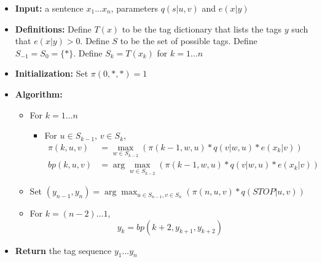 \documentclass[11pt]{scrartcl}
\begin{document}
\begin{itemize}
\item \textbf{Input:} a sentence $x_1 ... x_n$, parameters $q(s|u,v)$ and $e(x|y)$
\item \textbf{Definitions:} Define $T(x)$ to be the tag dictionary that lists the tags $y$ such that $e(x|y) > 0$. Define $S$ to be the set of possible tags. Define $S_{-1} = S_0 = \{*\}$. Define $S_k = T(x_k)$ for $k = 1 ... n$
\item \textbf{Initialization:} Set $\pi(0, *, *) = 1$
\item \textbf{Algorithm:}

\begin{itemize}
\item For $k = 1 ... n$

\begin{itemize}
\item For $u \in S_{k-1}$, $v \in S_{k}$,
\begin{align*}
\pi(k, u, v) &= \max_{w \in S_{k-2}} \left( \pi(k-1, w, u) * q(v | w, u) * e(x_k | v) \right) \\
bp(k, u, v) &= \arg \max_{w \in S_{k-2}} \left( \pi(k-1, w, u) * q(v | w, u) * e(x_k | v) \right)
\end{align*}
\end{itemize}
\item Set $(y_{n-1}, y_n) = \arg \max_{u \in S_{n-1}, v \in S_{n}} (\pi (n, u, v) * q(STOP | u, v))$
\item For $k = (n-2) ... 1$,
\[ y_k = bp(k+2, y_{k+1}, y_{k+2}) \]
\end{itemize}
\item \textbf{Return} the tag sequence $y_1 ... y_n$
\end{itemize}
\end{document}
